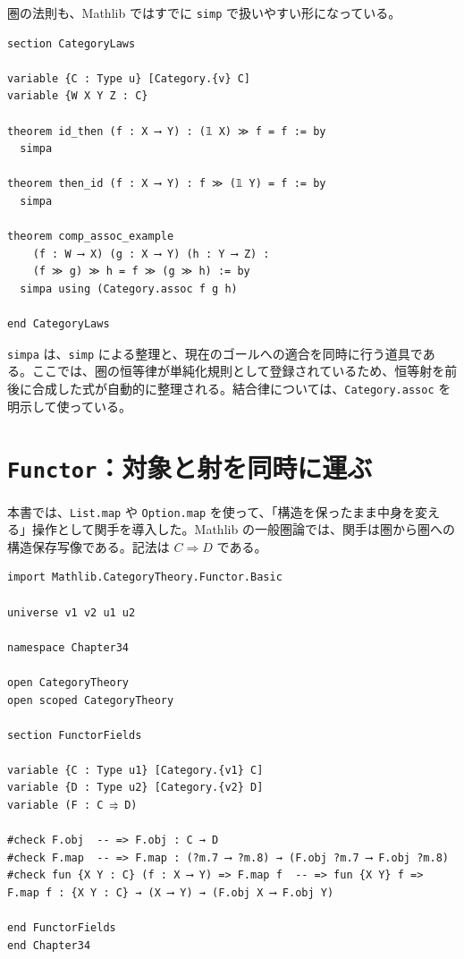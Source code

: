 圏の法則も、Mathlib ではすでに \texttt{simp} で扱いやすい形になっている。

\begin{listing}[htbp]
\begin{verbatim}
section CategoryLaws

variable {C : Type u} [Category.{v} C]
variable {W X Y Z : C}

theorem id_then (f : X ⟶ Y) : (𝟙 X) ≫ f = f := by
  simpa

theorem then_id (f : X ⟶ Y) : f ≫ (𝟙 Y) = f := by
  simpa

theorem comp_assoc_example
    (f : W ⟶ X) (g : X ⟶ Y) (h : Y ⟶ Z) :
    (f ≫ g) ≫ h = f ≫ (g ≫ h) := by
  simpa using (Category.assoc f g h)

end CategoryLaws
\end{verbatim}
\caption{恒等律と結合律を Mathlib の記法で使う}
\label{lst:ch34_category_laws}
\end{listing}

\begin{leanbox}
\texttt{simpa} は、\texttt{simp} による整理と、現在のゴールへの適合を同時に行う道具である。ここでは、圏の恒等律が単純化規則として登録されているため、恒等射を前後に合成した式が自動的に整理される。結合律については、\texttt{Category.assoc} を明示して使っている。
\end{leanbox}

\section{\texttt{Functor}：対象と射を同時に運ぶ}

本書では、\texttt{List.map} や \texttt{Option.map} を使って、「構造を保ったまま中身を変える」操作として関手を導入した。Mathlib の一般圏論では、関手は圏から圏への構造保存写像である。記法は \(C \Rightarrow D\) である。

\begin{listing}[htbp]
\begin{verbatim}
import Mathlib.CategoryTheory.Functor.Basic

universe v1 v2 u1 u2

namespace Chapter34

open CategoryTheory
open scoped CategoryTheory

section FunctorFields

variable {C : Type u1} [Category.{v1} C]
variable {D : Type u2} [Category.{v2} D]
variable (F : C ⥤ D)

#check F.obj  -- => F.obj : C → D
#check F.map  -- => F.map : (?m.7 ⟶ ?m.8) → (F.obj ?m.7 ⟶ F.obj ?m.8)
#check fun {X Y : C} (f : X ⟶ Y) => F.map f  -- => fun {X Y} f => F.map f : {X Y : C} → (X ⟶ Y) → (F.obj X ⟶ F.obj Y)

end FunctorFields
end Chapter34
\end{verbatim}
\caption{Functor の obj と map を読む}
\label{lst:ch34_functor_basic}
\end{listing}

